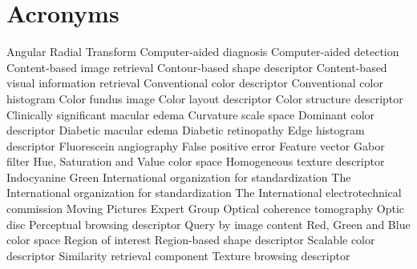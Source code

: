     \chapter*{Acronyms}
    \begin{acronym}[UML]
         {Angular Radial Transform}
         {Computer-aided diagnosis}
         {Computer-aided detection}
         {Content-based image retrieval}
         {Contour-based shape descriptor}
         {Content-based visual information retrieval}
         {Conventional color descriptor}
         {Conventional color histogram}
         {Color fundus image}
         {Color layout descriptor}
         {Color structure descriptor}
         {Clinically significant macular edema}
         {Curvature scale space}
         {Dominant color descriptor}
         {Diabetic macular edema}
         {Diabetic retinopathy}
         {Edge histogram descriptor}
         {Fluorescein angiography} 
         {False positive error}
         {Feature vector}
         {Gabor filter}
         {Hue, Saturation and Value color space}
         {Homogeneous texture descriptor}
         {Indocyanine Green}
         {International organization for standardization}
         {The International organization for standardization} 
         {The International electrotechnical commission} 
         {Moving Pictures Expert Group}
         {Optical coherence tomography}
         {Optic disc}
         {Perceptual browsing descriptor}
         {Query by image content}
         {Red, Green and Blue color space}
         {Region of interest}
         {Region-based shape descriptor}
         {Scalable color descriptor}
         {Similarity retrieval component}
         {Texture browsing descriptor}
    \end{acronym}                     
\endgroup

\cleardoublepage
